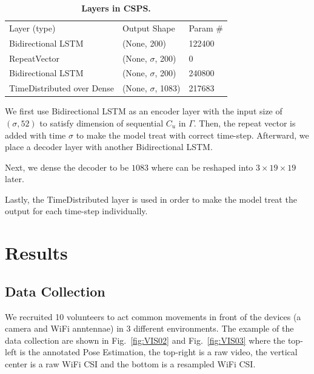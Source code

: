 \documentclass[10pt,letterpaper]{article}
\newlength\savedwidth
\newcommand\thickhline{\noalign{\global\savedwidth\arrayrulewidth\global\arrayrulewidth 2pt}%
	\hline
	\noalign{\global\arrayrulewidth\savedwidth}}
\begin{document}
	\begin{table}[!ht]
		\begin{adjustwidth}{-2.25in}{0in} %
			\centering
			\caption{
				{\bf Layers in CSPS.}}
			\begin{tabular}{lll}
				\hline
				Layer (type)       & Output Shape     & Param \# \\ 
				\thickhline
				Bidirectional LSTM & (None, 200)      & 122400   \\
				RepeatVector       & (None, $\sigma$, 200)  & 0        \\
				Bidirectional LSTM & (None, $\sigma$, 200)  & 240800   \\
				TimeDistributed over Dense    & (None, $\sigma$, 1083) & 217683   \\ \hline
			\end{tabular}
			
			\begin{flushleft} 
			\end{flushleft}
			\label{table:CSPS}
		\end{adjustwidth}
	\end{table}
	
	
	We first use Bidirectional LSTM as an encoder layer with the input size of $(\sigma,52)$ to satisfy dimension of sequential $C_u$ in $\Gamma$.
	Then, the repeat vector is added with time $\sigma$ to make the model treat with correct time-step. Afterward, we place a decoder layer with another Bidirectional LSTM. 
	
	Next, we dense the decoder to be $1083$ where can be reshaped into $3\times 19\times 19$ later.
	
	Lastly,  the TimeDistributed layer is used in order to make the model treat the output for each time-step individually.
	
	
	
	\section*{Results}
	
	\subsection*{Data Collection}

	We recruited 10 volunteers to act common movements in front of the devices (a camera and WiFi anntennae) in 3 different environments. The example of the data collection are shown in Fig.~\ref{fig:VIS02} and Fig.~\ref{fig:VIS03} where the top-left is the annotated Pose Estimation, the top-right is a raw video, the vertical center is a raw WiFi CSI and the bottom is a resampled WiFi CSI.
	
\end{document}
